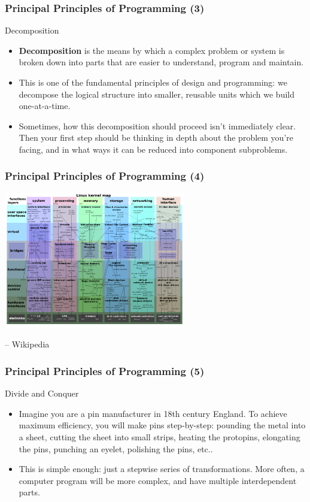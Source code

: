 \documentclass[10pt]{beamer}
\begin{document}
\begin{frame}
  \frametitle{Principal Principles of Programming (3)}
  \begin{block}{Decomposition}
    \begin{itemize}
      \item \textbf{Decomposition} is the means by which a complex problem or system is broken down into parts that are easier to understand, program and maintain.
      \item This is one of the fundamental principles of design and programming: we decompose the logical structure into smaller, reusable units which we build one-at-a-time.
      \item Sometimes, how this decomposition should proceed isn't immediately clear.
        Then your first step should be thinking in depth about the problem you're facing, and in what ways it can be reduced into component subproblems.
    \end{itemize}
  \end{block}
\end{frame}

\begin{frame}
  \frametitle{Principal Principles of Programming (4)}
  \centering
  \includegraphics[width=300px]{LinuxKernelMap.png}
  \begin{flushright} 
    \footnotesize -- Wikipedia
  \end{flushright}
\end{frame}

\begin{frame}
  \frametitle{Principal Principles of Programming (5)}
  \begin{block}{Divide and Conquer}
    \begin{itemize}
      \item Imagine you are a pin manufacturer in 18th century England.
        To achieve maximum efficiency, you will make pins step-by-step: pounding the metal into a sheet, cutting the sheet into small strips, heating the protopins, elongating the pins, punching an eyelet, polishing the pins, etc..
      \item This is simple enough: just a stepwise series of transformations.
        More often, a computer program will be more complex, and have multiple interdependent parts.
    \end{itemize}
  \end{block}
\end{frame}
\end{document}
